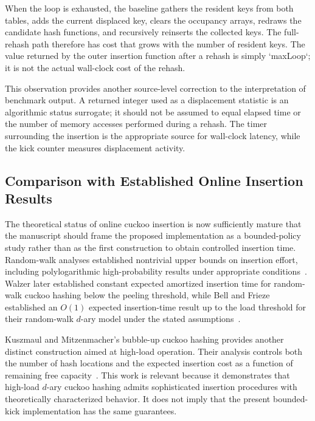 \documentclass[conference]{IEEEtran}
\begin{document}
When the loop is exhausted, the baseline gathers the resident keys from both tables, adds the current displaced key, clears the occupancy arrays, redraws the candidate hash functions, and recursively reinserts the collected keys. The full-rehash path therefore has cost that grows with the number of resident keys. The value returned by the outer insertion function after a rehash is simply `maxLoop`; it is not the actual wall-clock cost of the rehash.

This observation provides another source-level correction to the interpretation of benchmark output. A returned integer used as a displacement statistic is an algorithmic status surrogate; it should not be assumed to equal elapsed time or the number of memory accesses performed during a rehash. The timer surrounding the insertion is the appropriate source for wall-clock latency, while the kick counter measures displacement activity.

\subsection{Comparison with Established Online Insertion Results}

The theoretical status of online cuckoo insertion is now sufficiently mature that the manuscript should frame the proposed implementation as a bounded-policy study rather than as the first construction to obtain controlled insertion time. Random-walk analyses established nontrivial upper bounds on insertion effort, including polylogarithmic high-probability results under appropriate conditions~\cite{fountoulakis2010insertion}. Walzer later established constant expected amortized insertion time for random-walk cuckoo hashing below the peeling threshold, while Bell and Frieze established an $O(1)$ expected insertion-time result up to the load threshold for their random-walk $d$-ary model under the stated assumptions~\cite{walzer2022insertion,bell2024constant}.

Kuszmaul and Mitzenmacher's bubble-up cuckoo hashing provides another distinct construction aimed at high-load operation. Their analysis controls both the number of hash locations and the expected insertion cost as a function of remaining free capacity~\cite{kuszmaul2025bubbling}. This work is relevant because it demonstrates that high-load $d$-ary cuckoo hashing admits sophisticated insertion procedures with theoretically characterized behavior. It does not imply that the present bounded-kick implementation has the same guarantees.
\end{document}
